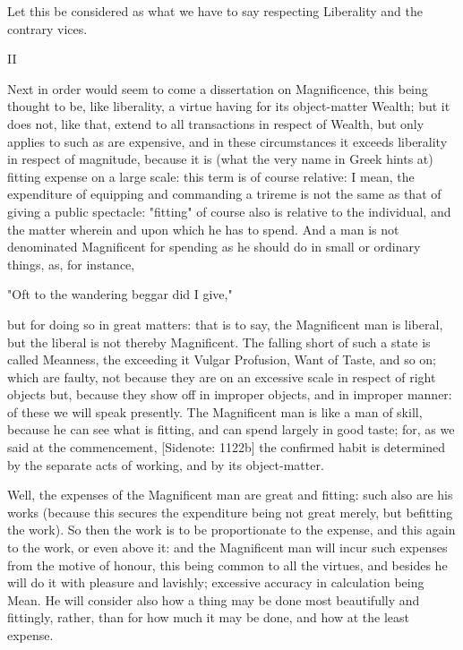 Let this be considered as what we have to say respecting Liberality and
the contrary vices.

II

Next in order would seem to come a dissertation on Magnificence,
this being thought to be, like liberality, a virtue having for its
object-matter Wealth; but it does not, like that, extend to all
transactions in respect of Wealth, but only applies to such as are
expensive, and in these circumstances it exceeds liberality in respect
of magnitude, because it is (what the very name in Greek hints at)
fitting expense on a large scale: this term is of course relative: I
mean, the expenditure of equipping and commanding a trireme is not the
same as that of giving a public spectacle: "fitting" of course also is
relative to the individual, and the matter wherein and upon which he has
to spend. And a man is not denominated Magnificent for spending as he
should do in small or ordinary things, as, for instance,

  "Oft to the wandering beggar did I give,"

but for doing so in great matters: that is to say, the Magnificent man
is liberal, but the liberal is not thereby Magnificent. The falling
short of such a state is called Meanness, the exceeding it Vulgar
Profusion, Want of Taste, and so on; which are faulty, not because they
are on an excessive scale in respect of right objects but, because they
show off in improper objects, and in improper manner: of these we will
speak presently. The Magnificent man is like a man of skill, because he
can see what is fitting, and can spend largely in good taste; for, as
we said at the commencement, [Sidenote: 1122b] the confirmed habit is
determined by the separate acts of working, and by its object-matter.

Well, the expenses of the Magnificent man are great and fitting: such
also are his works (because this secures the expenditure being not great
merely, but befitting the work). So then the work is to be proportionate
to the expense, and this again to the work, or even above it: and the
Magnificent man will incur such expenses from the motive of honour, this
being common to all the virtues, and besides he will do it with pleasure
and lavishly; excessive accuracy in calculation being Mean. He will
consider also how a thing may be done most beautifully and fittingly,
rather, than for how much it may be done, and how at the least expense.

